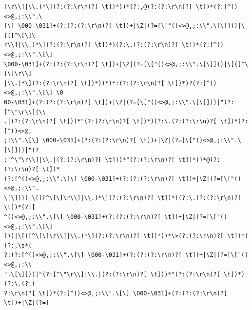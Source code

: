 \documentclass{beamer}
\begin{document}
\begin{frame}[fragile]
\begingroup
 \fontsize{6pt}{8pt}\selectfont
\begin{verbatim}
]\r\\]|\\.)*\](?:(?:\r\n)?[ \t])*))*(?:,@(?:(?:\r\n)?[ \t])*(?:[^()<>@,;:\\".\
[\] \000-\031]+(?:(?:(?:\r\n)?[ \t])+|\Z|(?=[\["()<>@,;:\\".\[\]]))|\[([^\[\]\
r\\]|\\.)*\](?:(?:\r\n)?[ \t])*)(?:\.(?:(?:\r\n)?[ \t])*(?:[^()<>@,;:\\".\[\]
\000-\031]+(?:(?:(?:\r\n)?[ \t])+|\Z|(?=[\["()<>@,;:\\".\[\]]))|\[([^\[\]\r\\]
|\\.)*\](?:(?:\r\n)?[ \t])*))*)*:(?:(?:\r\n)?[ \t])*)?(?:[^()<>@,;:\\".\[\] \0
00-\031]+(?:(?:(?:\r\n)?[ \t])+|\Z|(?=[\["()<>@,;:\\".\[\]]))|"(?:[^\"\r\\]|\\
.|(?:(?:\r\n)?[ \t]))*"(?:(?:\r\n)?[ \t])*)(?:\.(?:(?:\r\n)?[ \t])*(?:[^()<>@,
;:\\".\[\] \000-\031]+(?:(?:(?:\r\n)?[ \t])+|\Z|(?=[\["()<>@,;:\\".\[\]]))|"(?
:[^\"\r\\]|\\.|(?:(?:\r\n)?[ \t]))*"(?:(?:\r\n)?[ \t])*))*@(?:(?:\r\n)?[ \t])*
(?:[^()<>@,;:\\".\[\] \000-\031]+(?:(?:(?:\r\n)?[ \t])+|\Z|(?=[\["()<>@,;:\\".
\[\]]))|\[([^\[\]\r\\]|\\.)*\](?:(?:\r\n)?[ \t])*)(?:\.(?:(?:\r\n)?[ \t])*(?:[
^()<>@,;:\\".\[\] \000-\031]+(?:(?:(?:\r\n)?[ \t])+|\Z|(?=[\["()<>@,;:\\".\[\]
]))|\[([^\[\]\r\\]|\\.)*\](?:(?:\r\n)?[ \t])*))*\>(?:(?:\r\n)?[ \t])*)(?:,\s*(
?:(?:[^()<>@,;:\\".\[\] \000-\031]+(?:(?:(?:\r\n)?[ \t])+|\Z|(?=[\["()<>@,;:\\
".\[\]]))|"(?:[^\"\r\\]|\\.|(?:(?:\r\n)?[ \t]))*"(?:(?:\r\n)?[ \t])*)(?:\.(?:(
?:\r\n)?[ \t])*(?:[^()<>@,;:\\".\[\] \000-\031]+(?:(?:(?:\r\n)?[ \t])+|\Z|(?=[

\end{verbatim}
\end{frame}
\end{document}
